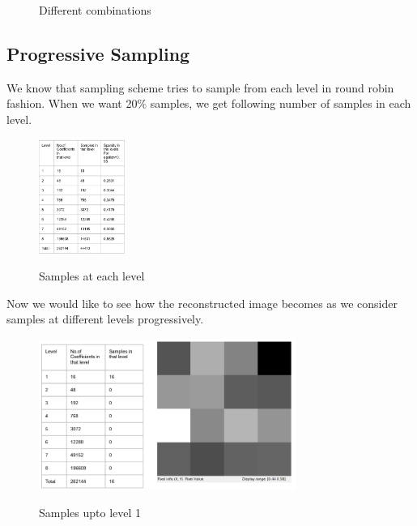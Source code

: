\documentclass{article}
\begin{document}
\begin{figure}[h]
 \centering    
 \caption{Different combinations}
\end{figure} 


\subsection{Progressive Sampling}

We know that sampling scheme tries to sample from each level in round robin fashion. When we want 20\% samples, we get following number of samples in each level. 

\begin{figure}[ht]
 \centering  
 \includegraphics[width=0.25\textwidth]{Figures/Sample_each_level.png}
 \label{fig:1}
 \caption{Samples at each level}
\end{figure}

Now we would like to see how the reconstructed image becomes as we consider samples at different levels progressively.

\begin{figure}[ht]
 \centering  
 \includegraphics[width=0.75\textwidth]{Figures/upto_level1.png}
 \label{fig:1}
 \caption{Samples upto level 1}
\end{figure}
\end{document}
